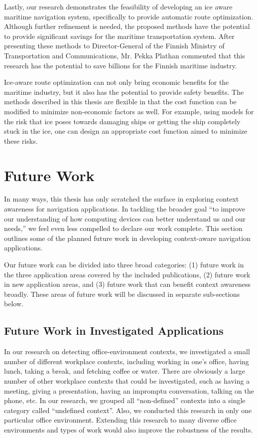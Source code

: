 Lastly, our research demonstrates the feasibility of developing an ice aware maritime navigation system, specifically to provide automatic route optimization. Although further refinement is needed, the proposed methods have the potential to provide significant savings for the maritime transportation system. After presenting these methods to Director-General of the Finnish Ministry of Transportation and Communications, Mr. Pekka Plathan commented that this research has the potential to save billions for the Finnish maritime industry.

Ice-aware route optimization can not only bring economic benefits for the maritime industry, but it also has the potential to provide safety benefits. The methods described in this thesis are flexible in that the cost function can be modified to minimize non-economic factors as well. For example, using models for the risk that ice poses towards damaging ships or getting the ship completely stuck in the ice, one can design an appropriate cost function aimed to minimize these risks.

\section{Future Work}
\label{sec:future_work}

In many ways, this thesis has only scratched the surface in exploring context awareness for navigation applications. In tackling the broader goal ``to improve our understanding of how computing devices can better understand us and our needs,'' we feel even less compelled to declare our work complete. This section outlines some of the planned future work in developing context-aware navigation applications.

Our future work can be divided into three broad categories: (1) future work in the three application areas covered by the included publications, (2) future work in new application areas, and (3) future work that can benefit context awareness broadly. These areas of future work will be discussed in separate sub-sections below.
%
\subsection{Future Work in Investigated Applications}
\label{sec:future_applications}

In our research on detecting office-environment contexts, we investigated a small number of different workplace contexts, including working in one's office, having lunch, taking a break, and fetching coffee or water. There are obviously a large number of other workplace contexts that could be investigated, such as having a meeting, giving a presentation, having an impromptu conversation, talking on the phone, etc. In our research, we grouped all ``non-defined'' contexts into a single category called ``undefined context''. Also, we conducted this research in only one particular office environment. Extending this research to many diverse office environments and types of work would also improve the robustness of the results.

